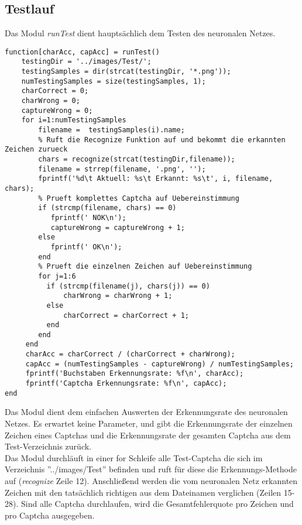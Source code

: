 \subsection{Testlauf}
Das Modul \textit{runTest} dient hauptsächlich dem Testen des neuronalen Netzes. 
\begin{lstlisting}
function[charAcc, capAcc] = runTest()
    testingDir = '../images/Test/';    
    testingSamples = dir(strcat(testingDir, '*.png'));
    numTestingSamples = size(testingSamples, 1);
    charCorrect = 0;
    charWrong = 0;
    captureWrong = 0;
    for i=1:numTestingSamples
        filename =  testingSamples(i).name;
        % Ruft die Recognize Funktion auf und bekommt die erkannten Zeichen zurueck
        chars = recognize(strcat(testingDir,filename));
        filename = strrep(filename, '.png', '');
        fprintf('%d\t Aktuell: %s\t Erkannt: %s\t', i, filename, chars);
        % Prueft komplettes Captcha auf Uebereinstimmung
        if (strcmp(filename, chars) == 0)
           fprintf(' NOK\n');
           captureWrong = captureWrong + 1;
        else
           fprintf(' OK\n');
        end
        % Prueft die einzelnen Zeichen auf Uebereinstimmung
        for j=1:6
          if (strcmp(filename(j), chars(j)) == 0) 
              charWrong = charWrong + 1;
          else
              charCorrect = charCorrect + 1;
          end
        end   
     end
     charAcc = charCorrect / (charCorrect + charWrong);
     capAcc = (numTestingSamples - captureWrong) / numTestingSamples;
     fprintf('Buchstaben Erkennungsrate: %f\n', charAcc);
     fprintf('Captcha Erkennungsrate: %f\n', capAcc);
end
\end{lstlisting}
Das Modul dient dem einfachen Auswerten der Erkennungsrate des neuronalen Netzes. Es erwartet keine Parameter, und gibt die Erkennungsrate der einzelnen Zeichen eines Captchas und die Erkennungsrate der gesamten Captcha aus dem Test-Verzeichnis zurück.\\
Das Modul durchläuft in einer for Schleife alle Test-Captcha die sich im Verzeichnis ''../images/Test'' befinden und ruft für diese die Erkennungs-Methode auf (\textit{recognize} Zeile 12). Anschließend werden die vom neuronalen Netz erkannten Zeichen mit den tatsächlich richtigen aus dem Dateinamen verglichen (Zeilen 15-28). Sind alle Captcha durchlaufen, wird die Gesamtfehlerquote pro Zeichen und pro Captcha ausgegeben.
